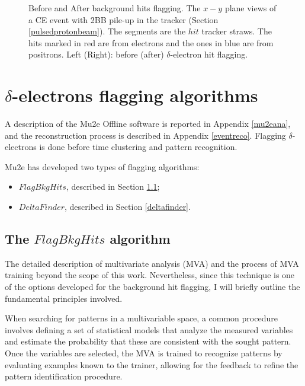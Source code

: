 \begin{figure}[!h]
\begin{subfigure}[b]{0.7\linewidth}
        \label{fig:af}
    \end{subfigure}
    \caption[Before and After background hits flagging.]{
        Before and After background hits flagging. 
        The $x-y$ plane views of a CE 
    event with 2BB pile-up in the tracker (Section \ref{pulsedprotonbeam}). 
    The segments are the $hit$ tracker straws. 
    The hits marked in
    red are from electrons and the ones in 
    blue are from positrons. Left (Right): before (after) $\delta$-electron hit flagging.}
    \label{fig:afbef} 
\end{figure}






\section{$\delta$-electrons flagging algorithms}
A  description of the Mu2e Offline software  
is reported in Appendix \ref{mu2eana}, and the reconstruction 
process is described in Appendix \ref{eventreco}. 
Flagging $\delta$-electrons is done before  time clustering 
and pattern recognition.

Mu2e has developed two types of  flagging algorithms:
\begin{itemize}
    \item $FlagBkgHits$, described in Section \ref{flagbkghits};
    \item $DeltaFinder$, described in Section \ref{deltafinder}.
\end{itemize}

\subsection{The $FlagBkgHits$ algorithm}\label{flagbkghits}
The detailed description of multivariate 
analysis (MVA) and the 
process of MVA training  beyond the 
scope of this work. 
Nevertheless, since this technique is 
one of the options 
developed for the background hit flagging, I 
will briefly outline 
the fundamental principles involved.

When searching for patterns in a multivariable space, 
a common procedure involves 
defining a set of statistical 
models that analyze the measured 
variables and estimate 
the probability that these are consistent with the 
sought pattern. Once the variables are selected, 
the MVA is trained to recognize patterns by 
evaluating examples known to the trainer, 
allowing for the feedback to refine the 
pattern identification procedure.

